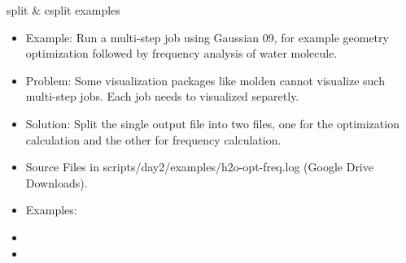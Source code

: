 \documentclass[10pt,t]{beamer}
\begin{document}
\begin{frame}[c]{split \& csplit examples}
  \begin{itemize}
    \item Example: Run a multi-step job using Gaussian 09, for example geometry optimization followed by frequency analysis of water molecule.
    \item Problem: Some visualization packages like molden cannot visualize such multi-step jobs. Each job needs to visualized separetly.
    \item Solution: Split the single output file into two files, one for the optimization calculation and the other for frequency calculation.
    \item Source Files in scripts/day2/examples/h2o-opt-freq.log (Google Drive Downloads).
    \item Examples: 
    \item[] 
    \item[] 
  \end{itemize}
\end{frame}
\end{document}
